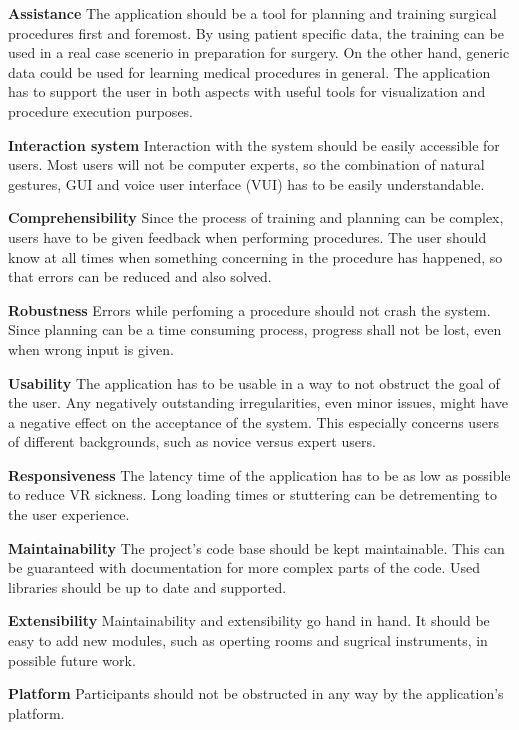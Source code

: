 \begin{compactenum}[label=(\Roman*)]
    \item \label{req::N1}\textbf{Assistance} The application should be a tool for planning and training surgical procedures first and foremost.
    By using patient specific data, the training can be used in a real case scenerio in preparation for surgery.
    On the other hand, generic data could be used for learning medical procedures in general.
    The application has to support the user in both aspects with useful tools for visualization and procedure execution purposes.
    \item \label{req::N2}\textbf{Interaction system} Interaction with the system should be easily accessible for users.
    Most users will not be computer experts, so the combination of natural gestures, GUI and voice user interface (VUI) has to be easily understandable.
    \item \label{req::N3}\textbf{Comprehensibility} Since the process of training and planning can be complex, users have to be given feedback when performing procedures.
    The user should know at all times when something concerning in the procedure has happened, so that errors can be reduced and also solved.
    \item \label{req::N4}\textbf{Robustness} Errors while perfoming a procedure should not crash the system.
    Since planning can be a time consuming process, progress shall not be lost, even when wrong input is given.
    \item \label{req::N5}\textbf{Usability} The application has to be usable in a way to not obstruct the goal of the user.
    Any negatively outstanding irregularities, even minor issues, might have a negative effect on the acceptance of the system.
    This especially concerns users of different backgrounds, such as novice versus expert users.
    \item \label{req::N6}\textbf{Responsiveness} The latency time of the application has to be as low as possible to reduce VR sickness.
    Long loading times or stuttering can be detrementing to the user experience.
    \item \label{req::N7}\textbf{Maintainability} The project’s code base should be kept maintainable.
    This can be guaranteed with documentation for more complex parts of the code.
    Used libraries should be up to date and supported.
    \item \label{req::N8}\textbf{Extensibility} Maintainability and extensibility go hand in hand.
    It should be easy to add new modules, such as operting rooms and sugrical instruments, in possible future work.
    \item \label{req::N9}\textbf{Platform} Participants should not be obstructed in any way by the application’s platform.
\end{compactenum}